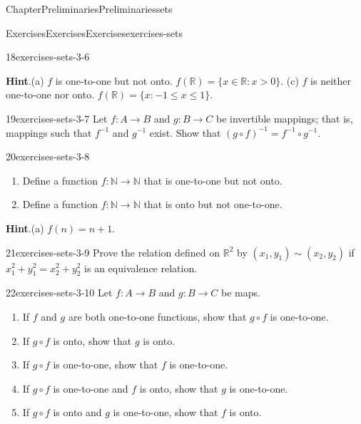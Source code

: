 \documentclass[oneside,10pt,]{book}
\newcommand{\blocktitlefont}{\relax}
\numberwithin{equation}{section}
\newcommand{\gt}{>}
\begin{document}
\begin{chapterptx}{Chapter}{Preliminaries}{}{Preliminaries}{}{}{sets}
\begin{exercises-section}{Exercises}{Exercises}{}{Exercises}{}{}{exercises-sets}
\begin{divisionexercise}{18}{}{}{exercises-sets-3-6}
\par\smallskip%
\noindent\textbf{\blocktitlefont Hint}.\hypertarget{exercises-sets-3-6-2}{}\quad{}(a) \(f\) is one-to-one but not onto. \(f({\mathbb R} ) = \{ x \in {\mathbb R} : x \gt 0 \}\).  (c) \(f\) is neither one-to-one nor onto.  \(f(\mathbb R) = \{ x : -1 \leq x \leq 1 \}\).%
\end{divisionexercise}%
\begin{divisionexercise}{19}{}{}{exercises-sets-3-7}%
Let \(f :A \rightarrow B\) and \(g : B \rightarrow C\) be invertible mappings; that is, mappings such that \(f^{-1}\) and \(g^{-1}\) exist. Show that \((g \circ f)^{-1} =f^{-1} \circ g^{-1}\).%
\end{divisionexercise}%
\begin{divisionexercise}{20}{}{}{exercises-sets-3-8}%
%
\begin{enumerate}[label={(\alph*)}]
\item{}Define a function \(f: {\mathbb N} \rightarrow {\mathbb N}\) that is one-to-one but not onto.%
\item{}Define a function \(f: {\mathbb N} \rightarrow {\mathbb N}\) that is onto but not one-to-one.%
\end{enumerate}
\par\smallskip%
\noindent\textbf{\blocktitlefont Hint}.\hypertarget{exercises-sets-3-8-2}{}\quad{}(a) \(f(n) = n + 1\).%
\end{divisionexercise}%
\begin{divisionexercise}{21}{}{}{exercises-sets-3-9}%
Prove the relation defined on \({\mathbb R}^2\) by \((x_1, y_1 ) \sim (x_2, y_2)\) if \(x_1^2 + y_1^2 = x_2^2 + y_2^2\) is  an equivalence relation.%
\end{divisionexercise}%
\begin{divisionexercise}{22}{}{}{exercises-sets-3-10}%
Let \(f : A \rightarrow B\) and \(g : B \rightarrow C\) be maps.%
%
\begin{enumerate}[label={(\alph*)}]
\item{}If \(f\) and \(g\) are both one-to-one functions, show that \(g \circ f\) is one-to-one.%
\item{}If \(g \circ f\) is onto, show that \(g\) is onto.%
\item{}If \(g \circ f\) is one-to-one, show that \(f\) is one-to-one.%
\item{}If \(g \circ f\) is one-to-one and \(f\) is onto, show that \(g\) is one-to-one.%
\item{}If \(g \circ f\) is onto and \(g\) is one-to-one, show that \(f\) is onto.%

\end{enumerate}
\end{divisionexercise}
\end{exercises-section}
\end{chapterptx}
\end{document}
